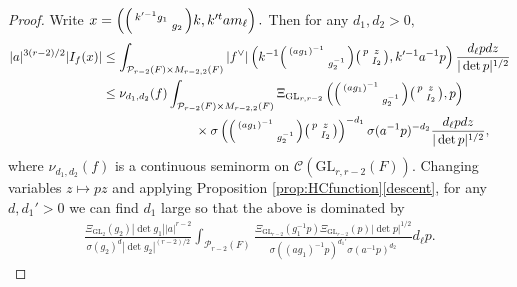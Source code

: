 \documentclass[12pt]{amsart}
\theoremstyle{remark}
\numberwithin{equation}{section}
\newcommand{\GL}{\mathrm{GL}}
\theoremstyle{definition}
\newenvironment{psmatrix}
  {\left(\begin{smallmatrix}}
  {\end{smallmatrix}\right)}
\numberwithin{equation}{subsection}
\begin{document}
\begin{proof}
Write $x=\left(\begin{psmatrix}
    k'^{-1}g_1 & \\
     & g_2
\end{psmatrix}k, k'^tam_\ell\right).$ Then for any $d_1,d_2>0,$
\begin{align*}
    |a|^{3(r-2)/2}|I_f(x)|&\le \int_{\mathcal{P}_{r-2}(F) \times M_{r-2,2}(F)}|f^\vee|\left(k^{-1}\begin{psmatrix}
        (ag_1)^{-1} &\\
         & g_2^{-1}
    \end{psmatrix}\begin{psmatrix}p & z\\ & I_2 \end{psmatrix},k'^{-1}a^{-1}p\right) \frac{d_\ell p dz}{|\det p|^{1/2}}\\
    &\leq \nu_{d_1,d_2}(f) \int_{\mathcal{P}_{r-2}(F) \times M_{r-2,2}(F)}\Xi_{\GL_{r,r-2}}\left(\begin{psmatrix}
       (ag_1)^{-1} &\\
         & g_2^{-1}
    \end{psmatrix}\begin{psmatrix}p & z\\ & I_2 \end{psmatrix},p\right)\\
    &\hspace{1in} \times \sigma\left(\begin{psmatrix}
        (ag_1)^{-1} &\\
         & g_2^{-1}
    \end{psmatrix}\begin{psmatrix}p & z\\ & I_2 \end{psmatrix}\right)^{-d_1}\sigma(a^{-1}p)^{-d_2} \frac{d_\ell p dz}{|\det p|^{1/2}},
\end{align*}
where $\nu_{d_1,d_2}(f)$ is a continuous seminorm on $\mathcal{C}(\GL_{r,r-2}(F)).$
Changing variables $z\mapsto pz$ and applying Proposition \ref{prop:HCfunction}\ref{descent}, for any $d,d_1'>0$ we can find $d_1$ large so that the above is dominated by 
\begin{align}\label{eq:intP}
   \frac{\Xi_{\GL_{2}}(g_2)|\det g_1||a|^{r-2}}{\sigma(g_2)^d|\det g_2|^{(r-2)/2}}\int_{\mathcal{P}_{r-2}(F)}\frac{\Xi_{\GL_{r-2}}(g_1^{-1}p)\Xi_{\GL_{r-2}}(p)|\det p|^{1/2}}{\sigma
        ((ag_1)^{-1}p)^{d_1'}\sigma(a^{-1}p)^{d_2}}d_\ell p.
\end{align}

\end{proof}
\end{document}
